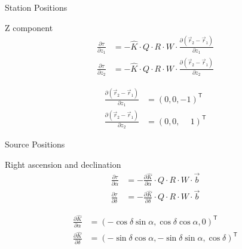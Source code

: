\documentclass[14pt,table,t, c]{beamer}
\begin{document}
\begin{frame}{Station Positions}
\begin{block}{Z component}
\vspace*{-\baselineskip}\setlength\belowdisplayskip{0pt}\setlength\abovedisplayskip{0pt}
\begin{align*}
\frac{\partial \tau}{\partial z_1} &= - \hat{K} \cdot Q \cdot R \cdot W \cdot \frac{\partial (\vec{r}_2 -
\vec{r}_1)}{\partial z_1}\\
\frac{\partial \tau}{\partial z_2} &= - \hat{K} \cdot Q \cdot R \cdot W \cdot \frac{\partial (\vec{r}_2 -
\vec{r}_1)}{\partial z_2} 
\end{align*}
\end{block}
\begin{block}{\vspace*{-3ex}}
\vspace*{-\baselineskip}\setlength\belowdisplayskip{0pt}\setlength\abovedisplayskip{5pt}
\begin{align*}
\frac{\partial (\vec{r}_2 -\vec{r}_1)}{\partial z_1} &= (0, 0, -1)^\mathsf{T} \\
\frac{\partial (\vec{r}_2 -\vec{r}_1)}{\partial z_2} &= (0, 0, \phantom{-}1)^\mathsf{T}
\end{align*}
\end{block}
\end{frame}

\begin{frame}{Source Positions}
\begin{block}{Right ascension and declination}
\vspace*{-\baselineskip}\setlength\belowdisplayskip{0pt}\setlength\abovedisplayskip{0pt}
\begin{align*}
\frac{\partial \tau}{\partial \alpha} &= - \frac{\partial \hat{K}}{\partial \alpha} \cdot Q \cdot R \cdot W \cdot
\vec{b} \\
\frac{\partial \tau}{\partial \delta} &= - \frac{\partial \hat{K}}{\partial \delta} \cdot Q \cdot R \cdot W \cdot
\vec{b}
\end{align*}
\end{block}
\begin{block}{\vspace*{-3ex}}
\vspace*{-\baselineskip}\setlength\belowdisplayskip{0pt}\setlength\abovedisplayskip{5pt}
\begin{align*}
\frac{\partial \hat{K}}{\partial \alpha} &= (-\cos \delta \sin \alpha, \cos \delta \cos \alpha, 0)^\mathsf{T} \\
\frac{\partial \hat{K}}{\partial \delta} &= (-\sin \delta \cos \alpha, -\sin \delta \sin \alpha, \cos \delta)^\mathsf{T}
\end{align*}
\end{block}
\end{frame}
\end{document}
